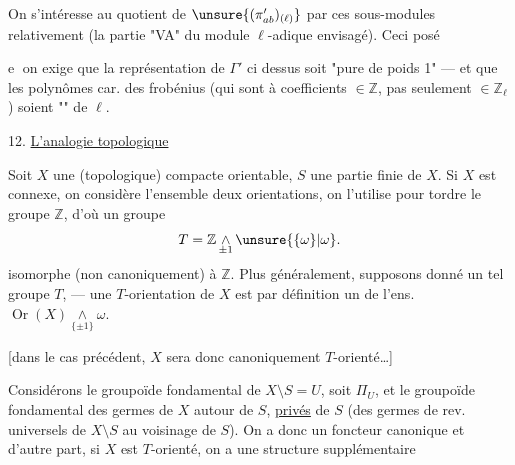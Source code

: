 
On s'intéresse au quotient de \(\unsure{(\pi'_{ab})_{(\ell)}}\) par ces
sous-modules relativement  (la partie "VA" du
module \(\ell\)-adique envisagé). Ceci posé

\textcircled{e} on exige que la représentation de \(\Gamma'\) ci dessus soit
"pure de poids 1" ---  et que les polynômes car.
des frobénius (qui sont à coefficients \(\in\mathbb Z\), pas seulement
\(\in\mathbb Z_\ell\)) soient "" de \(\ell\).



12. \uline{L'analogie topologique}

Soit \(X\) une  (topologique) compacte
orientable, \(S\) une partie finie de \(X\). Si \(X\) est connexe, on considère
l'ensemble \inserted{\unsure{\(\omega\)}}  deux orientations,
on l'utilise pour tordre le groupe \(\mathbb Z\), d'où un groupe 
\[
T=\mathbb Z\mathop{\wedge}\limits_{\pm1}\unsure{\{\omega\}|\omega}.
\]
isomorphe (non canoniquement) à \(\mathbb Z\). Plus généralement, supposons
donné un tel groupe \(T\),
--- une \(T\)-orientation de \(X\) est par définition un 
de l'ens. \(\operatorname{Or}(X)\mathop{\wedge}\limits_{\{\pm1\}}\omega\).

[dans le cas précédent, \(X\) sera donc canoniquement \(T\)-orienté\ldots]

Considérons le groupoïde fondamental de \(X\setminus S=U\), soit \(\Pi_U\),
et le groupoïde fondamental  des germes
 de \(X\) autour de \(S\), \uline{privés} de \(S\)
(des germes de rev. universels de \(X\setminus S\) au voisinage de \(S\)).
On a donc un foncteur canonique
et d'autre part,  si \(X\) est \(T\)-orienté, on a une
structure supplémentaire

